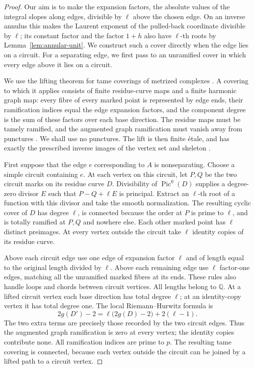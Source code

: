 \begin{proof}
Our aim is to make the expansion factors, the absolute values of the
integral slopes along edges, divisible by $\ell$ above the chosen edge.
On an inverse annulus this makes the Laurent exponent of
the pulled-back coordinate divisible by $\ell$; its constant factor and
the factor $1+h$ also have $\ell$-th roots by
Lemma~\ref{lem:annular-unit}.  We construct such a cover directly when
the edge lies on a circuit.  For a separating edge, we first pass to an
unramified cover in which every edge above it lies on a circuit.

We use the lifting theorem for tame coverings of metrized complexes
\cite[Theorem~7.7]{ABBR}.  A covering to which it applies consists of
finite residue-curve maps and a finite harmonic graph map: every fibre of
every marked point is represented by edge ends, their ramification
indices equal the edge expansion factors, and the component degree is
the sum of these factors over each base direction.  The residue maps
must be tamely ramified, and the augmented graph ramification must
vanish away from punctures
\cite[Definitions~2.19 and~2.21]{ABBR}.
We shall use no punctures.  The lift is then finite \'etale, and has
exactly the prescribed inverse images of the vertex set and skeleton
\cite[Definitions~4.25 and~4.31]{ABBR}.

First suppose that the edge $e$ corresponding to $A$ is nonseparating.
Choose a simple circuit containing $e$.  At each vertex on this circuit,
let $P,Q$ be the two circuit marks on its residue curve $D$.
Divisibility of $\operatorname{Pic}^0(D)$
\cite[Theorem~8.2]{MilneAV} supplies a degree-zero divisor
$E$ such that $P-Q+\ell E$ is principal.  Extract an $\ell$-th root of a
function with this divisor and take the smooth normalization.
The resulting cyclic cover of $D$ has degree $\ell$, is connected
because the order at $P$ is prime to $\ell$, and is totally ramified at
$P,Q$ and nowhere else.  Each other marked point has $\ell$ distinct
preimages.  At every vertex outside the circuit take $\ell$ identity
copies of its residue curve.

Above each circuit edge use one edge of expansion factor $\ell$ and of
length equal to the original length divided by $\ell$.  Above each
remaining edge use $\ell$ factor-one edges, matching all the unramified
marked fibres at its ends.  These rules also handle loops and chords
between circuit vertices.  All lengths belong to $\mathbb Q$.
At a lifted circuit vertex each base direction has total degree $\ell$;
at an identity-copy vertex it has total degree one.
The local Riemann--Hurwitz formula is
\[
 2g(D')-2=\ell\bigl(2g(D)-2\bigr)+2(\ell-1).
\]
The two extra terms are precisely those recorded by the two circuit
edges.  Thus the augmented graph ramification is zero at every vertex;
the identity copies contribute none.  All ramification indices are
prime to $p$.  The resulting tame covering is connected, because each
vertex outside the circuit can be joined by a lifted path to a circuit
vertex.


\end{proof}
